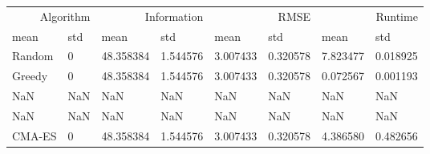 \begin{tabular}{llllllll}
\toprule
\multicolumn{2}{r}{Algorithm} & \multicolumn{2}{r}{Information} & \multicolumn{2}{r}{RMSE} & \multicolumn{2}{r}{Runtime} \\
mean & std & mean & std & mean & std & mean & std \\
\midrule
Random & 0 & 48.358384 & 1.544576 & 3.007433 & 0.320578 & 7.823477 & 0.018925 \\
Greedy & 0 & 48.358384 & 1.544576 & 3.007433 & 0.320578 & 0.072567 & 0.001193 \\
NaN & NaN & NaN & NaN & NaN & NaN & NaN & NaN \\
NaN & NaN & NaN & NaN & NaN & NaN & NaN & NaN \\
CMA-ES & 0 & 48.358384 & 1.544576 & 3.007433 & 0.320578 & 4.386580 & 0.482656 \\
\bottomrule
\end{tabular}
